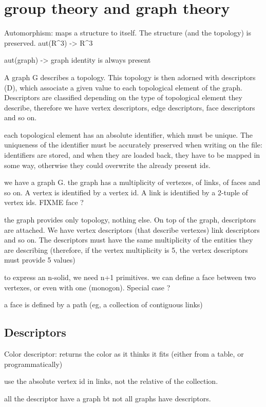 \section{group theory and graph theory}
Automorphism: maps a structure to itself. The structure (and the topology) is
preserved.
aut(R^3) -> R^3

aut(graph) -> graph
identity is always present 

A graph G describes a topology. This topology is then adorned with
descriptors (D), which associate a given value to each topological element of
the graph. Descriptors are classified depending on the type of topological
element they describe, therefore we have vertex descriptors, edge
descriptors, face descriptors and so on.

each topological element has an absolute identifier, which must be unique.
The uniqueness of the identifier must be accurately preserved when writing
on the file: identifiers are stored, and when they are loaded back, they
have to be mapped in some way, otherwise they could overwrite the already
present ids.

we have a graph G. the graph has a multiplicity of vertexes, of links, of
faces and so on. A vertex is identified by a vertex id. A link is identified
by a 2-tuple of vertex ids. FIXME face ?

the graph provides only topology, nothing else. On top of the graph,
descriptors are attached. We have vertex descriptors (that describe
vertexes) link descriptors and so on. The descriptors must have the same
multiplicity of the entities they are describing (therefore, if the vertex
multiplicity is 5, the vertex descriptors must provide 5 values)

to express an n-solid, we need n+1 primitives.
we can define a face between two vertexes, or even with one (monogon).
Special case ?

a face is defined by a path (eg, a collection of contiguous links)


\subsection{Descriptors}

Color descriptor: returns the color as it thinks it fits (either from a
table, or programmatically)

use the absolute vertex id in links, not the relative of the collection.

all the descriptor have a graph bt not all graphs have descriptors.


